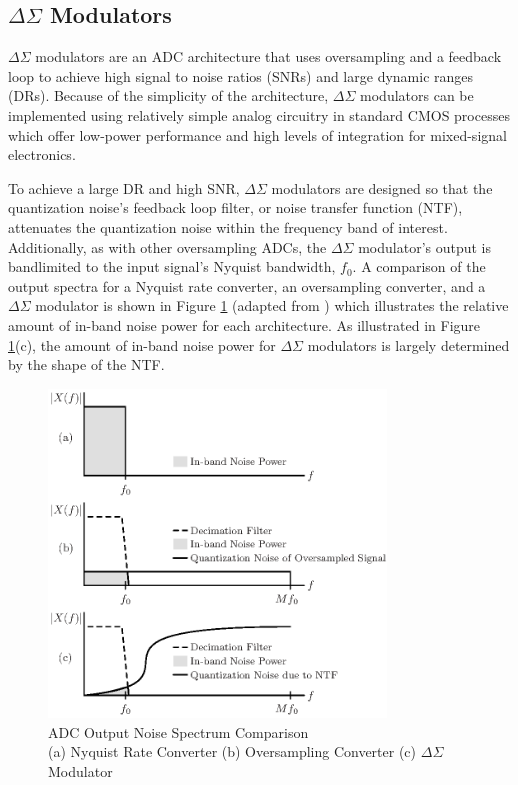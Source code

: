 \subsection[Delta Sigma Modulators]{$\Delta\Sigma$ Modulators}
$\Delta\Sigma$ modulators are an ADC architecture that uses oversampling and a feedback
loop to achieve high signal to noise ratios (SNRs) and large dynamic ranges (DRs). Because
of the simplicity of the architecture, $\Delta\Sigma$ modulators can be implemented
using relatively simple analog circuitry in standard CMOS processes which offer low-power
performance and high levels of integration for mixed-signal
electronics\cite{kester_analog_2006}.

To achieve a large DR and high SNR, $\Delta\Sigma$ modulators are designed so that the
quantization noise's feedback loop filter, or noise transfer function (NTF), attenuates
the quantization noise within the frequency band of interest. Additionally, as with other
oversampling ADCs, the $\Delta\Sigma$ modulator's output is bandlimited to the input
signal's Nyquist bandwidth, $f_0$. A comparison of the output spectra for a Nyquist rate
converter, an oversampling converter, and a $\Delta\Sigma$ modulator is shown in Figure
\ref{fig:ADC_spectrum_comparison} (adapted from \cite{kester_ADC_arch_2005}) which
illustrates the relative amount of in-band noise power for each architecture.
As illustrated in Figure \ref{fig:ADC_spectrum_comparison}(c), the amount of
in-band noise power for $\Delta\Sigma$ modulators is largely determined by the shape of
the NTF.
\begin{figure}[H]
 \centering
 \includegraphics[width=0.8\textwidth]{./final_figures/ADC_spectrum_comparison}
\captionsetup{justification=centering} 
\caption[]{
ADC Output Noise Spectrum Comparison\\
(a) Nyquist Rate Converter 
(b) Oversampling Converter 
(c) $\Delta\Sigma$ Modulator
}
 \label{fig:ADC_spectrum_comparison}
\end{figure}

